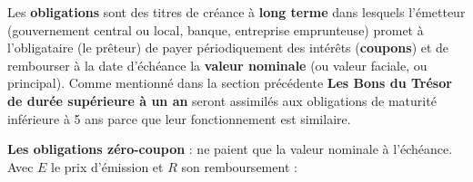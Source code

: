 \begin{f}

 Les \textbf{obligations} sont des titres de créance à \textbf{long terme} dans lesquels l'émetteur (gouvernement central ou local, banque, entreprise emprunteuse) promet à l'obligataire (le prêteur) de payer périodiquement des intérêts (\textbf{coupons}) et de rembourser à la date d'échéance la \textbf{valeur nominale} (ou valeur faciale, ou principal). 
Comme mentionné dans la section précédente \textbf{Les Bons du Trésor de durée supérieure à un an} seront assimilés aux obligations de maturité inférieure à 5 ans parce que leur fonctionnement est similaire.


\textbf{Les obligations zéro-coupon} : ne paient que la valeur nominale à l'échéance. Avec \(E\) le prix d'émission et \(R\) son remboursement :
	
\begin{center}
\end{center}


\end{f}
